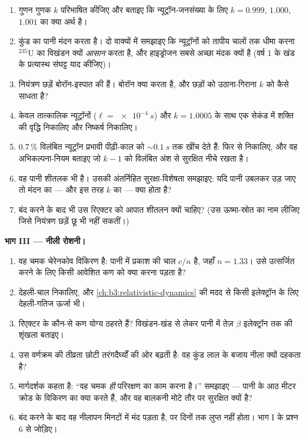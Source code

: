 \begin{problem}
\begin{enumerate}[resume]
  \item गुणन गुणक $k$ परिभाषित कीजिए और बताइए कि न्यूट्रॉन-जनसंख्या
        के लिए $k = 0.999$, $1.000$, $1.001$ का क्या अर्थ है।
  \item कुंड का पानी मंदन करता है। दो वाक्यों में समझाइए कि
        न्यूट्रॉनों को तापीय चालों तक धीमा करना $^{235}$U का विखंडन
        क्यों \emph{आसान} करता है, और हाइड्रोजन सबसे अच्छा मंदक
        क्यों है (वर्ष 1 के खंड के प्रत्यास्थ संघट्ट याद कीजिए)।
  \item नियंत्रण छड़ें बोरॉन-इस्पात की हैं। बोरॉन क्या करता है, और
        छड़ों को उठाना-गिराना $k$ को कैसे साधता है?
  \item केवल तात्कालिक न्यूट्रॉनों ($\ell = \qty{e-4}{s}$) और
        $k = 1.0005$ के साथ एक सेकंड में शक्ति की वृद्धि निकालिए
        और निष्कर्ष निकालिए।
  \item 0.7\,\% विलंबित न्यूट्रॉन प्रभावी पीढ़ी-काल को
        $\sim\qty{0.1}{s}$ तक खींच देते हैं: फिर से निकालिए, और वह
        अभिकल्पना-नियम बताइए जो $k - 1$ को विलंबित अंश से सुरक्षित
        नीचे रखता है।
  \item वह पानी शीतलक भी है। उसकी अंतर्निहित सुरक्षा-विशेषता
        समझाइए: यदि पानी उबलकर उड़ जाए तो मंदन का --- और इस तरह
        $k$ का --- क्या होता है?
  \item बंद करने के बाद भी उस रिएक्टर को आपात शीतलन क्यों चाहिए?
        (उस ऊष्मा-स्रोत का नाम लीजिए जिसे नियंत्रण छड़ें छू भी नहीं
        सकतीं।)
\end{enumerate}

\medskip\noindent\textbf{भाग III --- नीली रोशनी।}

\begin{enumerate}[resume]
  \item वह चमक चेरेनकोव विकिरण है: पानी में प्रकाश की चाल
        $c/n$ है, जहाँ $n = 1.33$। उसे उत्सर्जित करने के लिए किसी
        आवेशित कण को क्या करना पड़ता है?
  \item देहली-चाल निकालिए, और
        \cref{ch:b3:relativistic-dynamics} की मदद से किसी इलेक्ट्रॉन
        के लिए देहली-गतिज ऊर्जा भी।
  \item रिएक्टर के कौन-से कण योग्य ठहरते हैं? विखंडन-खंड से लेकर
        पानी में तेज़ $\beta$ इलेक्ट्रॉन तक की शृंखला बताइए।
  \item उस वर्णक्रम की तीव्रता छोटी तरंगदैर्घ्यों की ओर बढ़ती है:
        वह कुंड लाल के बजाय नीला क्यों दहकता है?
  \item मार्गदर्शक कहता है: ``वह चमक \emph{ही} परिरक्षण का काम करना
        है।'' समझाइए --- पानी के आठ मीटर क्रोड के विकिरण का क्या
        करते हैं, और वह बालकनी मोटे तौर पर सुरक्षित क्यों है?
  \item बंद करने के बाद वह नीलापन मिनटों में मंद पड़ता है, पर दिनों
        तक लुप्त नहीं होता। भाग I के प्रश्न 6 से जोड़िए।
\end{enumerate}


\end{problem}
